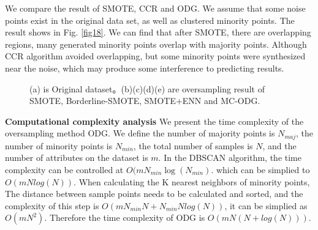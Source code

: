 \documentclass[ida]{iosart2x}
\begin{document}
We compare the result of SMOTE, CCR and ODG. We assume that some noise points exist in the original data set, 
as well as clustered minority points. The result shows in Fig. \ref{fig18}. 
We can find that after SMOTE, there are overlapping regions, many generated minority points 
overlap with majority points.
Although CCR algorithm avoided overlapping, 
but some minority points were synthesized near the noise, which may produce some interference to predicting results.
\begin{figure}[tb]
  \centering
  \quad
  \quad

  \quad
  \quad
  \caption{(a) is Original dataset。(b)(c)(d)(e) are oversampling result of SMOTE, 
  Borderline-SMOTE, SMOTE+ENN and MC-ODG.}
  \label{fig17}
  \end{figure}

\textbf{Computational complexity analysis}
We present the time complexity of the oversampling method ODG.
We define the number of majority points is $N_{maj}$, 
the number of minority points is $N_{min}$, the total number of samples is $N$, 
and the number of attributes on the dataset is $m$.
In the DBSCAN algorithm, the time complexity can be controlled at $O(mN_{min}\log(N_{min})$.
which can be simplied to $O(mNlog(N))$.
When calculating the K nearest neighbors of minority points,
The distance between sample points needs to be calculated and sorted, and the complexity of this step is
$O(mN_{min}N+N_{min}Nlog(N))$, it can be simplied as $O(mN^2)$. Therefore the time complexity of
ODG is $O(mN(N+log(N)))$.
\end{document}
